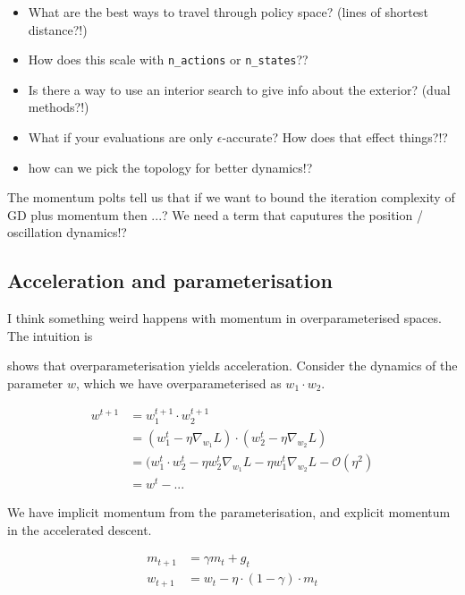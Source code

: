 \begin{itemize}
\tightlist
\item
  What are the best ways to travel through policy space? (lines of
  shortest distance?!)
\item
  How does this scale with \texttt{n\_actions} or \texttt{n\_states}??
\item
  Is there a way to use an interior search to give info about the
  exterior? (dual methods?!)
\item
  What if your evaluations are only \(\epsilon\)-accurate? How does that
  effect things?!?
\item
  how can we pick the topology for better dynamics!?
\end{itemize}




The momentum polts tell us that if we want to bound the iteration complexity of GD plus momentum
then ...? We need a term that caputures the position / oscillation dynamics!?


\subsection{Acceleration and parameterisation}

I think something weird happens with momentum in overparameterised spaces. The intuition is

\cite{Arora2018} shows that overparameterisation yields acceleration. Consider
the dynamics of the parameter $w$, which we have overparameterised as $w_1 \cdot w_2$.

\begin{align}
w^{t+1} &= w_1^{t+1} \cdot w_2^{t+1} \\
&= (w_1^t - \eta \nabla_{w_1} L)\cdot(w_2^t - \eta \nabla_{w_2} L) \\
&= (w_1^t \cdot w_2^t - \eta w_2^t \nabla_{w_1} L - \eta w_1^t \nabla_{w_2} L - \mathcal O(\eta^2) \\
&= w^t - ...
\end{align}

We have implicit momentum from the parameterisation, and explicit momentum in the accelerated descent.


\begin{align}
m_{t+1} &= \gamma m_t + g_t \\
w_{t+1} &= w_t - \eta \cdot (1-\gamma) \cdot m_t
\end{align}

